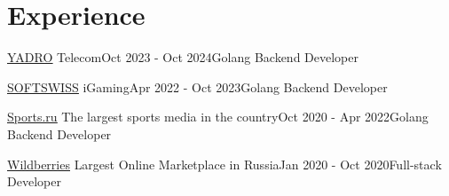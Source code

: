 \section{Experience}

\begin{experienceEntry}
{\href{https://yadro.com/}{\underline{YADRO}}}
{Telecom}{Oct 2023 - Oct 2024}{Golang Backend Developer}
    {}
\end{experienceEntry}

\vspace{1em}

\begin{experienceEntry}
{\href{https://softswiss.com}{\underline{SOFTSWISS}}}
{iGaming}{Apr 2022 - Oct 2023}{Golang Backend Developer}
    {}
\end{experienceEntry}

\vspace{1em}

\begin{experienceEntry}
{\href{https://sports.ru}{\underline{Sports.ru}}}
{The largest sports media in the country}{Oct 2020 - Apr 2022}{Golang Backend Developer}
    {}
\end{experienceEntry}

\vspace{1em}

\begin{experienceEntry}
{\href{https://wildberries.ru}{\underline{Wildberries}}}
{Largest Online Marketplace in Russia}{Jan 2020 - Oct 2020}{Full-stack Developer}
    {}
\end{experienceEntry}

\vspace{1em}
